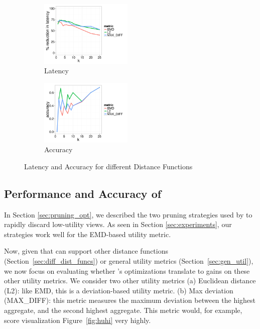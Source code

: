 {\begin{figure}[h]
	\centering
	\vspace*{-10pt}
	\begin{subfigure}{0.48\linewidth}
		\centering
		\includegraphics[width=4.4cm] {Images/in_memory_diff_metrics_latency.pdf}
		\vspace{-15pt}
		\caption{Latency}
		\label{fig:dist_latency}
	\end{subfigure}
	\begin{subfigure}{0.48\linewidth}
		\centering
		\includegraphics[width=4.4cm] {Images/in_memory_diff_metrics_accuracy.pdf}
		\vspace{-15pt}
		\caption{Accuracy}
		\label{fig:dist_accuracy}
	\end{subfigure}
	\vspace{-10pt}
\caption{Latency and Accuracy for different Distance Functions}	
		\vspace{-10pt}
\end{figure}


\subsection{Performance and Accuracy of {\large \SeeDB}}
In Section \ref{sec:pruning_opt}, we described the 
two pruning strategies used by \SeeDB
to rapidly discard low-utility views.
As seen in Section \ref{sec:experiments}, 
our strategies work well for the EMD-based 
utility metric.

Now, given that \SeeDB can support other
distance functions (Section~\ref{sec:diff_dist_funcs})
or general utility metrics (Section~\ref{sec:gen_util}),
we now focus on evaluating whether \SeeDB's optimizations
translate to gains on these other utility metrics.
We consider two other utility metrics
(a) Euclidean distance (L2): like EMD,
this is a deviation-based utility metric.
(b) Max deviation (MAX\_DIFF): this metric
measures the maximum deviation between
the highest aggregate, and the second highest
aggregate. This metric would, for example, score
visualization Figure~\ref{fig:huhi} very highly.


}
